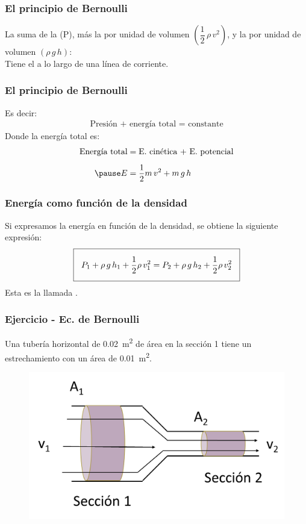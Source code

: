 \documentclass[14pt]{beamer}
\begin{document}
\begin{frame}
\frametitle{El principio de Bernoulli}
La suma de la  (P), \pause más la  por unidad de volumen $\left(\dfrac{1}{2} \, \rho \, v^{2} \right)$, \pause y la  por unidad de volumen $(\rho \, g \, h)$:
\\
\bigskip
\pause
Tiene el  a lo largo de una línea de corriente.
\end{frame}
\begin{frame}
\frametitle{El principio de Bernoulli}
Es decir:
\pause
\begin{align*}
\text{Presión + energía total = constante} 
\end{align*}
\pause
Donde la energía total es:
\pause
\begin{eqnarray*}
\begin{aligned}
\text{Energía total} &= \text{E. cinética + E. potencial} \\[0.5em] \pause
E &= \dfrac{1}{2} m \, v^{2} + m \, g \, h
\end{aligned}
\end{eqnarray*}
\end{frame}
\begin{frame}
\frametitle{Energía como función de la densidad}
Si expresamos la energía en función de la densidad, se obtiene la siguiente expresión:
\pause
\begin{align*}
\setlength{\fboxsep}{3\fboxsep}\boxed{
P_{1} + \rho \, g \, h_{1} + \dfrac{1}{2} \rho \, v_{1}^{2} = P_{2} + \rho \, g \, h_{2} + \dfrac{1}{2} \rho \, v_{2}^{2}}
\end{align*}
Esta es la llamada .
\end{frame}
\begin{frame}
\frametitle{Ejercicio - Ec. de Bernoulli}
\vspace*{-1cm}
Una tubería horizontal de \SI{0.02}{\square\meter} de área en la sección 1 tiene un estrechamiento con un área de \SI{0.01}{\square\meter}. 
\begin{figure}
    \centering
    \includegraphics[scale=0.8]{Imagenes/Ejercicio_Bernoulli_01.png}
\end{figure}
\end{frame}
\end{document}
